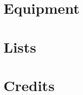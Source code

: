 \documentclass[12pt,a4paper,openany,usenames,dvipsnames]{book}
\begin{document}
	\chapter{Equipment}
	
	
	
	
	
	

	
%	

	\chapter{Lists}
	
	
	

	
	
	
	

	

	
	
	
	
	\chapter{Credits}
	
\end{document}
